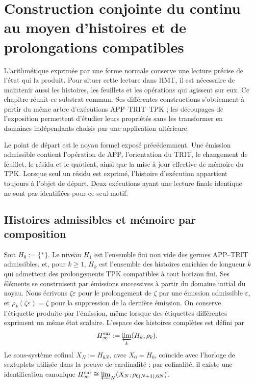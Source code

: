 \section{Construction conjointe du continu au moyen d'histoires et de prolongations compatibles}
\label{hmtfg:base:iv:continuo-conjunto}
L’arithmétique exprimée par une forme normale conserve une lecture précise de l’état qui la produit. Pour situer cette lecture dans HMT, il est nécessaire de maintenir aussi les histoires, les feuillets et les opérations qui agissent sur eux. Ce chapitre réunit ce substrat commun. Ses différentes constructions s’obtiennent à partir du même arbre d’exécutions APP–TRIT–TPK ; les découpages de l’exposition permettent d’étudier leurs propriétés sans les transformer en domaines indépendants choisis par une application ultérieure.

Le point de départ est le noyau formel exposé précédemment. Une émission admissible contient l’opération de APP, l’orientation du TRIT, le changement de feuillet, le résidu et le quotient, ainsi que la mise à jour effective de mémoire du TPK. Lorsque seul un résidu est exprimé, l’histoire d’exécution appartient toujours à l’objet de départ. Deux exécutions ayant une lecture finale identique ne sont pas identifiées pour ce seul motif.



\subsection{Histoires admissibles et mémoire par composition}
Soit \(H_0:=\{\ast\}\). Le niveau \(H_1\) est l’ensemble fini non vide des
germes APP--TRIT admissibles, et, pour \(k\geq1\), \(H_k\) est l’ensemble des
histoires enrichies de longueur \(k\) qui admettent des prolongements TPK
compatibles à tout horizon fini. Ses éléments se construisent par émissions
successives à partir du domaine initial du noyau. Nous écrivons \(\zeta\varepsilon\)
pour le prolongement de \(\zeta\) par une émission admissible \(\varepsilon\), et
\(\rho_k(\zeta\varepsilon)=\zeta\) pour la suppression de la dernière émission. On
conserve l’étiquette produite par l’émission, même lorsque des étiquettes
différentes expriment un même état scalaire. L’espace des histoires complètes
est défini par
\[
 H_\infty^{\rm enr}:=\varprojlim_k(H_k,\rho_k).
\]
Le sous-système cofinal \(X_N:=H_{6N}\), avec \(X_0=H_0\), coïncide avec l'horloge
de sextuplets utilisée dans la preuve de cardinalité ; par cofinalité, il existe une
identification canonique
\(H_\infty^{\rm enr}\cong\varprojlim_N(X_N,\rho_{6(N+1),6N})\).

